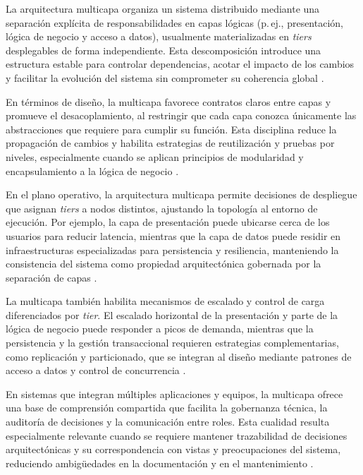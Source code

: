 				La arquitectura multicapa organiza un sistema distribuido mediante una separación explícita de responsabilidades en capas lógicas (p.\,ej., presentación, lógica de negocio y acceso a datos), usualmente materializadas en \textit{tiers} desplegables de forma independiente. Esta descomposición introduce una estructura estable para controlar dependencias, acotar el impacto de los cambios y facilitar la evolución del sistema sin comprometer su coherencia global \cite{Ozkaya2020ASurvey,ContrerasRivas2025Layered}.
				
				En términos de diseño, la multicapa favorece contratos claros entre capas y promueve el desacoplamiento, al restringir que cada capa conozca únicamente las abstracciones que requiere para cumplir su función. Esta disciplina reduce la propagación de cambios y habilita estrategias de reutilización y pruebas por niveles, especialmente cuando se aplican principios de modularidad y encapsulamiento a la lógica de negocio \cite{Ozkaya2020ASurvey}.
				
				En el plano operativo, la arquitectura multicapa permite decisiones de despliegue que asignan \textit{tiers} a nodos distintos, ajustando la topología al entorno de ejecución. Por ejemplo, la capa de presentación puede ubicarse cerca de los usuarios para reducir latencia, mientras que la capa de datos puede residir en infraestructuras especializadas para persistencia y resiliencia, manteniendo la consistencia del sistema como propiedad arquitectónica gobernada por la separación de capas \cite{ContrerasRivas2025Layered,Ozkaya2020ASurvey}.
				
				La multicapa también habilita mecanismos de escalado y control de carga diferenciados por \textit{tier}. El escalado horizontal de la presentación y parte de la lógica de negocio puede responder a picos de demanda, mientras que la persistencia y la gestión transaccional requieren estrategias complementarias, como replicación y particionado, que se integran al diseño mediante patrones de acceso a datos y control de concurrencia \cite{ContrerasRivas2025Layered}.
				
				En sistemas que integran múltiples aplicaciones y equipos, la multicapa ofrece una base de comprensión compartida que facilita la gobernanza técnica, la auditoría de decisiones y la comunicación entre roles. Esta cualidad resulta especialmente relevante cuando se requiere mantener trazabilidad de decisiones arquitectónicas y su correspondencia con vistas y preocupaciones del sistema, reduciendo ambigüedades en la documentación y en el mantenimiento \cite{Ozkaya2020ASurvey}.
				

